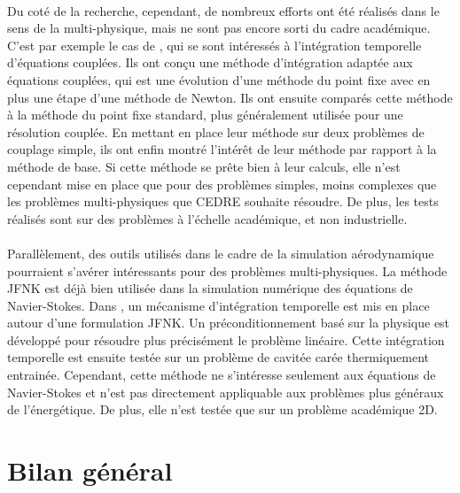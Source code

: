     \paragraph{}
    Du coté de la recherche, cependant, de nombreux efforts ont été réalisés dans le sens de la multi-physique, mais ne sont pas encore sorti du cadre académique.
    C'est par exemple le cas de \cite{WongKwokHorneEtAl2019}, qui se sont intéressés à l'intégration temporelle d'équations couplées.
    Ils ont conçu une méthode d'intégration adaptée aux équations couplées, qui est une évolution d'une méthode du point fixe avec en plus une étape d'une méthode de Newton.
    Ils ont ensuite comparés cette méthode à la méthode du point fixe standard, plus généralement utilisée pour une résolution couplée.
    En mettant en place leur méthode sur deux problèmes de couplage simple, ils ont enfin montré l’intérêt de leur méthode par rapport à la méthode de base.
    Si cette méthode se prête bien à leur calculs, elle n'est cependant mise en place que pour des problèmes simples, moins complexes que les problèmes multi-physiques que CEDRE souhaite résoudre.
    De plus, les tests réalisés sont sur des problèmes à l'échelle académique, et non industrielle.

    \paragraph{}
    Parallèlement, des outils utilisés dans le cadre de la simulation aérodynamique pourraient s'avérer intéressants pour des problèmes multi-physiques.
    La méthode JFNK est déjà bien utilisée dans la simulation numérique des équations de Navier-Stokes.
    Dans \cite{ParkNourgalievMartineauEtAl2009}, un mécanisme d'intégration temporelle est mis en place autour d'une formulation JFNK.
    Un préconditionnement basé sur la physique est développé pour résoudre plus précisément le problème linéaire.
    Cette intégration temporelle est ensuite testée sur un problème de cavitée carée thermiquement entrainée.
    Cependant, cette méthode ne s'intéresse seulement aux équations de Navier-Stokes et n'est pas directement appliquable aux problèmes plus généraux de l'énergétique.
    De plus, elle n'est testée que sur un problème académique 2D.


  \section*{Bilan général}

